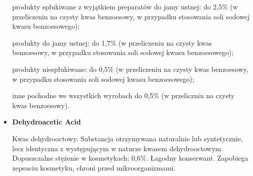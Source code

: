 \begin{itemize}
produkty spłukiwane z wyjątkiem preparatów do jamy ustnej: do 2,5\% (w przeliczeniu na czysty kwas benzoesowy, w przypadku stosowania soli sodowej kwasu benzoesowego);

produkty do jamy ustnej: do 1,7\% (w przeliczeniu na czysty kwas benzoesowy, w przypadku stosowania soli sodowej kwasu benzoesowego);

produkty niespłukiwane: do 0,5\% (w przeliczeniu na czysty kwas benzoesowy, w przypadku stosowania soli sodowej kwasu benzoesowego);

inne pochodne we wszystkich wyrobach do 0,5\% (w przeliczniu na czysty kwas benzoesowy).

\item \textbf{Dehydroacetic Acid}

Kwas dehydrooctowy. Substancja otrzymywana naturalnie lub syntetycznie, lecz identyczna z występującym w naturze kwasem dehydrooctowym. Dopuszczalne stężenie w kosmetykach: 0,6\%. Łagodny konserwant. Zapobiega zepsuciu kosmetyku, chroni przed mikroorganizmami.
\end{itemize}
